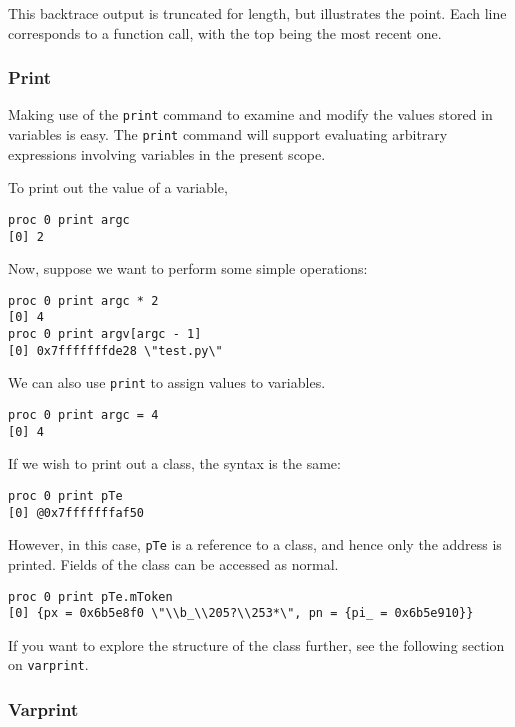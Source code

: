 \documentclass{refart}
\begin{document}
This backtrace output is truncated for length, but illustrates the point. Each line corresponds to a function call, with the top being the most recent one.

\subsubsection{Print}

Making use of the \texttt{print} command to examine and modify the values stored in variables is easy. The \texttt{print} command will support evaluating arbitrary expressions involving variables in the present scope.

To print out the value of a variable,

\begin{Verbatim}
proc 0 print argc
[0] 2
\end{Verbatim}

Now, suppose we want to perform some simple operations:

\begin{Verbatim}
proc 0 print argc * 2
[0] 4
proc 0 print argv[argc - 1]
[0] 0x7fffffffde28 \"test.py\"
\end{Verbatim}

We can also use \texttt{print} to assign values to variables.

\begin{Verbatim}
proc 0 print argc = 4
[0] 4
\end{Verbatim}

If we wish to print out a class, the syntax is the same:

\begin{Verbatim}
proc 0 print pTe
[0] @0x7fffffffaf50
\end{Verbatim}

However, in this case, \texttt{pTe} is a reference to a class, and hence only the address is printed. Fields of the class can be accessed as normal.

\begin{Verbatim}
proc 0 print pTe.mToken
[0] {px = 0x6b5e8f0 \"\\b_\\205?\\253*\", pn = {pi_ = 0x6b5e910}}
\end{Verbatim}

If you want to explore the structure of the class further, see the following section on \texttt{varprint}.

\subsubsection{Varprint}
\end{document}
